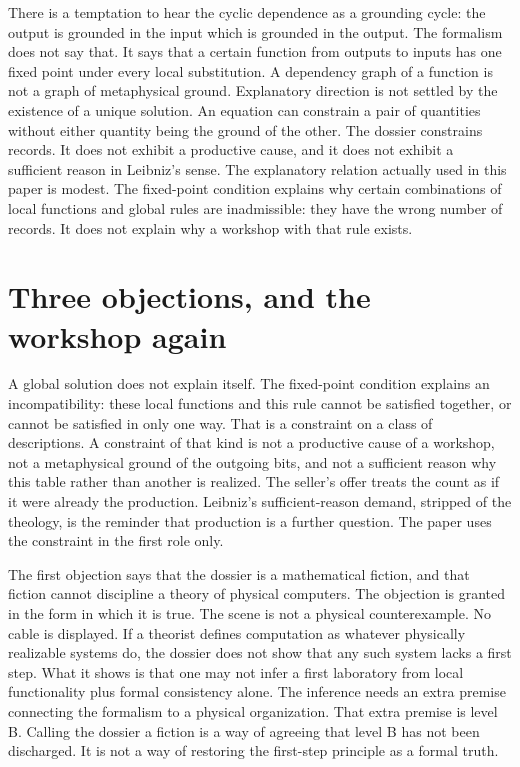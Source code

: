 \documentclass[11pt]{article}
\begin{document}
There is a temptation to hear the cyclic dependence as a grounding cycle: the output is grounded in the input which is grounded in the output. The formalism does not say that. It says that a certain function from outputs to inputs has one fixed point under every local substitution. A dependency graph of a function is not a graph of metaphysical ground. Explanatory direction is not settled by the existence of a unique solution. An equation can constrain a pair of quantities without either quantity being the ground of the other. The dossier constrains records. It does not exhibit a productive cause, and it does not exhibit a sufficient reason in Leibniz’s sense. The explanatory relation actually used in this paper is modest. The fixed-point condition explains why certain combinations of local functions and global rules are inadmissible: they have the wrong number of records. It does not explain why a workshop with that rule exists.

\section{Three objections, and the workshop again}
\label{sec:obj}

A global solution does not explain itself. The fixed-point condition explains an incompatibility: these local functions and this rule cannot be satisfied together, or cannot be satisfied in only one way. That is a constraint on a class of descriptions. A constraint of that kind is not a productive cause of a workshop, not a metaphysical ground of the outgoing bits, and not a sufficient reason why this table rather than another is realized. The seller’s offer treats the count as if it were already the production. Leibniz’s sufficient-reason demand, stripped of the theology, is the reminder that production is a further question. The paper uses the constraint in the first role only.

The first objection says that the dossier is a mathematical fiction, and that fiction cannot discipline a theory of physical computers. The objection is granted in the form in which it is true. The scene is not a physical counterexample. No cable is displayed. If a theorist defines computation as whatever physically realizable systems do, the dossier does not show that any such system lacks a first step. What it shows is that one may not infer a first laboratory from local functionality plus formal consistency alone. The inference needs an extra premise connecting the formalism to a physical organization. That extra premise is level B. Calling the dossier a fiction is a way of agreeing that level B has not been discharged. It is not a way of restoring the first-step principle as a formal truth.
\end{document}
